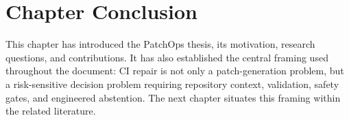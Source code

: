 \section{Chapter Conclusion}

This chapter has introduced the PatchOps thesis, its motivation, research questions, and contributions. It has
also established the central framing used throughout the document: CI repair is not only a patch-generation
problem, but a risk-sensitive decision problem requiring repository context, validation, safety gates, and
engineered abstention. The next chapter situates this framing within the related literature.
